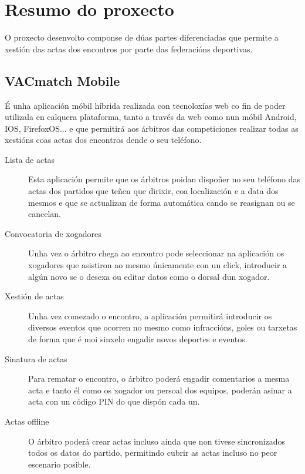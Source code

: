     \section{Resumo do proxecto}
    O proxecto desenvolto componse de dúas partes diferenciadas que permite a 
xestión das actas dos encontros por parte das federacións deportivas.
    
    \subsection{VACmatch Mobile}
    É unha aplicación móbil híbrida realizada con tecnoloxías web co fin de 
poder utilizala en calquera plataforma, tanto a través da web como nun móbil 
Android, IOS, FirefoxOS... e que permitirá aos árbitros das competiciones 
realizar todas as xestións coas actas dos encontros dende o seu teléfono.

  \begin{description}
    \item [Lista de actas]
    Esta aplicación permite que os árbitros poidan dispoñer no seu teléfono 
das actas dos partidos que teñen que dirixir, coa localización e a data dos 
mesmos e que se actualizan de forma automática cando se reasignan ou se 
cancelan.

    \item [Convocatoria de xogadores]
    Unha vez o árbitro chega ao encontro pode seleccionar na aplicación os 
xogadores que asistiron ao mesmo únicamente con un click, introducir a algún 
novo se o desexa ou editar datos como o dorsal dun xogador.

    \item [Xestión de actas]
    Unha vez comezado o encontro, a aplicación permitirá introducir os diversos 
eventos que ocorren no mesmo como infraccións, goles ou tarxetas de forma que é 
moi sinxelo engadir novos deportes e eventos.

    \item [Sinatura de actas]
    Para rematar o encontro, o árbitro poderá engadir comentarios a mesma acta 
e tanto él como os xogador ou persoal dos equipos, poderán asinar a acta con un 
código PIN do que dispón cada un.

    \item [Actas offline]
    O árbitro poderá crear actas incluso aínda que non tivese sincronizados 
todos os datos do partido, permitindo cubrir as actas incluso no peor escenario 
posible.

  \end{description} 

